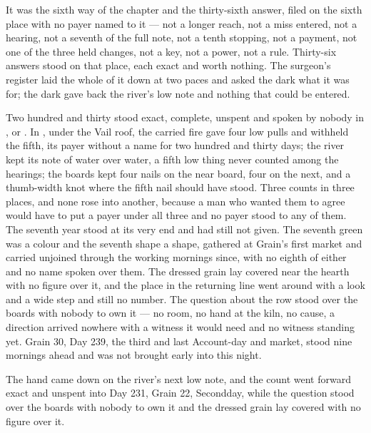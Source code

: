 It was the sixth way of the chapter and the thirty-sixth answer, filed on the sixth place with no payer named to it --- not a longer reach, not a miss entered, not a hearing, not a seventh of the full note, not a tenth stopping, not a payment, not one of the three held changes, not a key, not a power, not a rule. Thirty-six answers stood on that place, each exact and worth nothing. The surgeon's register laid the whole of it down at two paces and asked the dark what it was for; the dark gave back the river's low note and nothing that could be entered.

Two hundred and thirty stood exact, complete, unspent and spoken by nobody in ,  or . In , under the Vail roof, the carried fire gave four low pulls and withheld the fifth, its payer without a name for two hundred and thirty days; the river kept its note of water over water, a fifth low thing never counted among the hearings; the boards kept four nails on the near board, four on the next, and a thumb-width knot where the fifth nail should have stood. Three counts in three places, and none rose into another, because a man who wanted them to agree would have to put a payer under all three and no payer stood to any of them. The seventh year stood at its very end and had still not given. The seventh green was a colour and the seventh shape a shape, gathered at Grain's first market and carried unjoined through the working mornings since, with no eighth of either and no name spoken over them. The dressed grain lay covered near the hearth with no figure over it, and the place in the returning line went around with a look and a wide step and still no number. The question about the row stood over the boards with nobody to own it --- no room, no hand at the kiln, no cause, a direction arrived nowhere with a witness it would need and no witness standing yet. Grain 30, Day 239, the third and last Account-day and market, stood nine mornings ahead and was not brought early into this night.

The hand came down on the river's next low note, and the count went forward exact and unspent into Day 231, Grain 22, Secondday, while the question stood over the boards with nobody to own it and the dressed grain lay covered with no figure over it.
